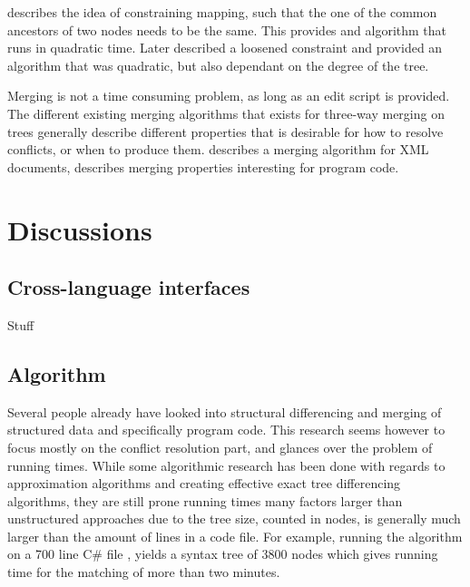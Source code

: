 \documentclass[11pt]{article}
\begin{document}
\citet{Zhang} describes the idea of constraining mapping, such that the one of the common ancestors of two nodes needs to be the same. This provides and algorithm that runs in quadratic time. Later \citet{Lu} described a loosened constraint and provided an algorithm that was quadratic, but also dependant on the degree of the tree.

Merging is not a time consuming problem, as long as an edit script is provided. The different existing merging algorithms that exists for three-way merging on trees generally describe different properties that is desirable for how to resolve conflicts, or when to produce them. \citet{lindholm} describes a merging algorithm for XML documents, \citet{Horwitz,Asklund,Olav} describes merging properties interesting for program code.

\clearpage

\section{Discussions}

\subsection{Cross-language interfaces}
Stuff 

\subsection{Algorithm}
Several people already have looked into structural differencing and merging of structured data and specifically program code. This research seems however to focus mostly on the conflict resolution part, and glances over the problem of running times. While some algorithmic research has been done with regards to approximation algorithms and creating effective exact tree differencing algorithms, they are still prone running times many factors larger than unstructured approaches due to the tree size, counted in nodes, is generally much larger than the amount of lines in a code file. For example, running the \citet{Pawlik} algorithm on a 700 line C\# file , yields a syntax tree of 3800 nodes which gives running time for the matching of more than two minutes.
\end{document}
